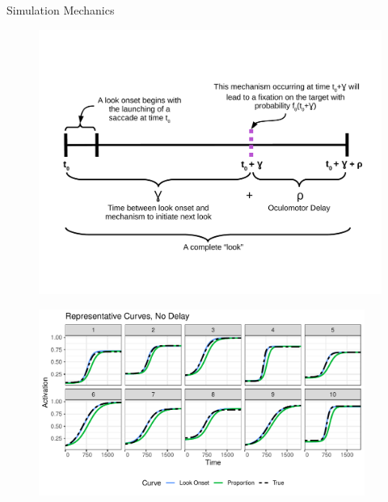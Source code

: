 \documentclass{beamer}
\newcommand{\vp}{\vspace{2mm}}
\begin{document}
\begin{frame}{Simulation Mechanics}

\vspace{-2.5mm}
\begin{figure}
\centering
\includegraphics[scale=0.4]{look_comp.pdf}
\end{figure}
\end{frame}

%
%
%


\begin{frame}
\begin{figure}[H]
\centering
\includegraphics[width=0.95\textwidth]{rep_curves_no_delay.pdf}
\end{figure}
\end{frame}
\end{document}
